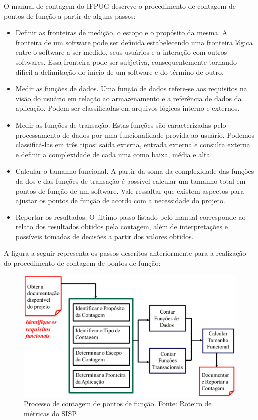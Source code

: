 O manual de contagem do IFPUG descreve o procedimento de contagem de pontos de função a partir de alguns passos:

\begin{itemize}

\item Definir as fronteiras de medição, o escopo e o propósito da mesma. A fronteira de um software pode ser definida estabelecendo uma fronteira lógica entre o software a ser medido, seus usuários e a interação com outros softwares. Essa fronteira pode ser subjetiva, consequentemente tornando difícil a delimitação do início de um software e do término de outro.

\item Medir as funções de dados. Uma função de dados refere-se aos requisitos na visão do usuário em relação ao armazenamento e a referência de dados da aplicação. Podem ser classificadas em arquivos lógicos interno e externos.

\item Medir as funções de transação. Estas funções são caracterizadas pelo processamento de dados por uma funcionalidade provida ao usuário. Podemos classificá-las em três tipos: saída externa, entrada externa e consulta externa e definir a complexidade de cada uma como baixa, média e alta.

\item Calcular o tamanho funcional. A partir da soma da complexidade das funções da dos e das funções de transação é possível calcular um tamanho total em pontos de função de um software. Vale ressaltar que existem aspectos para ajustar os pontos de função de acordo com a necessidade do projeto.

\item Reportar os resultados. O último passo listado pelo manual corresponde ao relato dos resultados obtidos pela contagem, além de interpretações e possíveis tomadas de decisões a partir dos valores obtidos.

\end{itemize}

A figura a seguir representa os passos descritos anteriormente para a realização do procedimento de contagem de pontos de função:

\begin{figure}[h]
	\centering
	\label{fig05}
		\includegraphics[keepaspectratio=true,scale=0.4]{figuras/fig05.eps}
	\caption{Processo de contagem de pontos de função. Fonte: Roteiro de métricas do SISP}
\end{figure}


